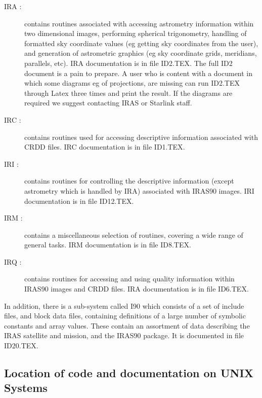 \documentclass[twoside,11pt,nolof]{starlink}
\begin{document}
\begin{description}

\item [IRA :] contains routines associated with accessing astrometry
information within two dimensional images, performing spherical
trigonometry, handling of formatted sky coordinate values (eg getting
sky coordinates from the user), and generation of astrometric graphics
(eg sky coordinate grids, meridians, parallels, etc). {\small IRA}
documentation is in file {\small ID2.TEX}. The full {\small ID2}
document is a pain to prepare. A user who is content with a document in
which some diagrams eg of projections, are missing can run {\small ID2.TEX}
through Latex three times and print the result. If the diagrams are required
we suggest contacting IRAS or Starlink staff.

\item [IRC :] contains routines used for accessing descriptive
information associated with {\small CRDD} files. {\small IRC}
documentation is in file {\small ID1.TEX}.

\item [IRI :] contains routines for controlling the descriptive
information (except astrometry which is handled by {\small IRA})
associated with {\small IRAS90} images. {\small IRI} documentation is
in file {\small ID12.TEX}.

\item [IRM :] contains a miscellaneous selection of routines, covering
a wide range of general tasks. {\small IRM} documentation is in file
{\small ID8.TEX}.

\item [IRQ :] contains routines for accessing and using quality
information within {\small IRAS90} images and {\small CRDD} files.
{\small IRA} documentation is in file {\small ID6.TEX}.

\end{description}

In addition, there is a sub-system called I90 which consists of a set
of include files, and block data files, containing definitions of a
large number of symbolic constants and array values. These contain an
assortment of data describing the {\small IRAS} satellite and mission,
and the {\small IRAS90} package. It is documented in file {\small
ID20.TEX}.

\subsection{Location of code and documentation on UNIX Systems
\label{SEC:UNIXS}}
\end{document}

